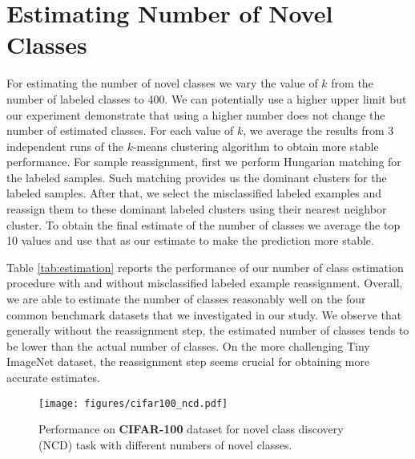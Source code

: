 \documentclass[runningheads]{eccv2022submission}
\begin{document}
\section{Estimating Number of Novel Classes}
\label{sec:novel_estimate}
For estimating the number of novel classes we vary the value of $k$ from the number of labeled classes to 400. We can potentially use a higher upper limit but our experiment demonstrate that using a higher number does not change the number of estimated classes. For each value of $k$, we average the results from 3 independent runs of the $k$-means clustering algorithm to obtain more stable performance. For sample reassignment, first we perform Hungarian matching \cite{kuhn1955hungarian} for the labeled samples. Such matching provides us the dominant clusters for the labeled samples. After that, we select the misclassified labeled examples and reassign them to these dominant labeled clusters using their nearest neighbor cluster. To obtain the final estimate of the number of classes we average the top 10 values and use that as our estimate to make the prediction more stable.


Table \ref{tab:estimation} reports the performance of our number of class estimation procedure with and without misclassified labeled example reassignment. Overall, we are able to estimate the number of classes reasonably well on the four common benchmark datasets that we investigated in our study. We observe that generally without the reassignment step, the estimated number of classes tends to be lower than the actual number of classes. On the more challenging Tiny ImageNet dataset, the reassignment step seems crucial for obtaining more accurate estimates.



\begin{figure}[h]
\begin{center}
\texttt{[image: figures/cifar100\_ncd.pdf]}
\caption{Performance on \textbf{CIFAR-100} dataset for novel class discovery (NCD) task with different numbers of novel classes.}
\label{fig:ncd}
\vspace{-12mm}
\end{center}
\end{figure}
\end{document}
